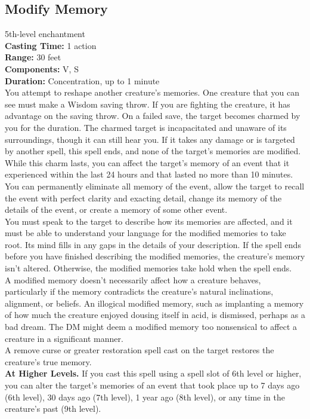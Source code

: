 \documentclass[11pt, A4paper, english]{article}
\begin{document}
		\subsection{Modify Memory}
5th-level enchantment \\
\textbf{Casting Time:} 1 action \\
\textbf{Range:} 30 feet \\
\textbf{Components:} V, S \\
\textbf{Duration:} Concentration, up to 1 minute \\
You attempt to reshape another creature’s memories. One creature that you can see must make a Wisdom  saving throw. If you are fighting the creature, it has advantage on the saving throw. On a failed save, the target becomes charmed by you for the duration. The charmed target is incapacitated and unaware of its surroundings, though it can still hear you. If it takes any damage or is targeted by another spell, this spell ends, and none of the target’s memories are modified. \\
While this charm lasts, you can affect the target’s memory of an event that it experienced within the last 24 hours and that lasted no more than 10 minutes. You can permanently eliminate all memory of the event, allow the target to recall the event with perfect clarity and exacting detail, change its memory of the details of the event, or create a memory of some other event. \\
You must speak to the target to describe how its memories are affected, and it must be able to understand your language for the modified memories to take root. Its mind fills in any gaps in the details of your description. If the spell ends before you have finished describing the modified memories, the creature’s memory isn’t altered. Otherwise, the modified memories take hold when the spell ends. \\
A modified memory doesn’t necessarily affect how a creature behaves, particularly if the memory contradicts the creature’s natural inclinations, alignment, or beliefs. An illogical modified memory, such as implanting a memory of how much the creature enjoyed dousing itself in acid, is dismissed, perhaps as a bad dream. The DM might deem a modified memory too nonsensical to affect a creature in a significant manner. \\
A remove curse or greater restoration spell cast on the target restores the creature’s true memory. \\
\textbf{At Higher Levels.} If you cast this spell using a spell slot of 6th level or higher, you can alter the target’s memories of an event that took place up to 7 days ago (6th level), 30 days ago (7th level),  1 year ago (8th level), or any time in the creature’s past (9th level).
\end{document}

